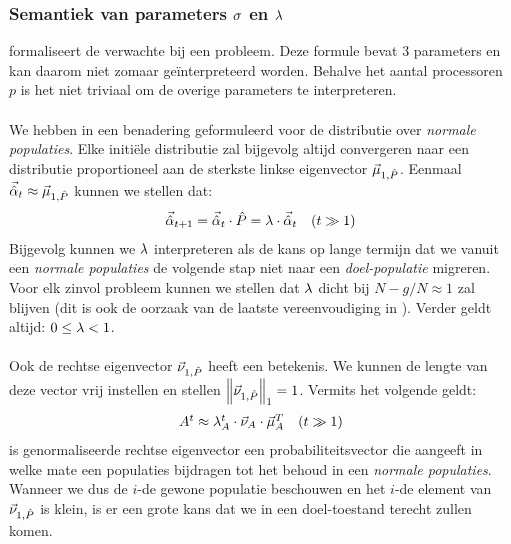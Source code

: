 \subsubsection{Semantiek van parameters $\metapa$ en $\metapb$}

 formaliseert de verwachte \absu{} bij een probleem. Deze formule bevat 3 parameters en kan daarom niet zomaar ge\"interpreteerd worden. Behalve het aantal processoren $p$ is het niet triviaal om de overige parameters te interpreteren.

\paragraph{}
We hebben in  een benadering geformuleerd voor de distributie over \emph{normale populaties}. Elke initi\"ele distributie zal bijgevolg altijd convergeren naar een distributie proportioneel aan de sterkste linkse eigenvector $\evl[1,\removmat]$. Eenmaal $\probdistnormmeta{t}\approx\evl[1,\removmat]$ kunnen we stellen dat:
\begin{equation}
\conditional{\probdistnormmeta{t+1}=\probdistnormmeta{t}\cdot\removmat=\metapb\cdot\probdistnormmeta{t}}{$t\gg 1$}
\end{equation}
Bijgevolg kunnen we $\metapb$ interpreteren als de kans op lange termijn dat we vanuit een \emph{normale populaties} de volgende stap niet naar een \emph{doel-populatie} migreren. Voor elk zinvol probleem kunnen we stellen dat $\metapb$ dicht bij $N-g/N\approx 1$ zal blijven (dit is ook de oorzaak van de laatste vereenvoudiging in ). Verder geldt altijd: $0\leq\metapb<1$.

\paragraph{}
Ook de rechtse eigenvector $\evr[1,\removmat]$ heeft een betekenis. We kunnen de lengte van deze vector vrij instellen en stellen $\dabs[1]{\evr[1,\removmat]}=1$. Vermits het volgende geldt:
\begin{equation}
\conditional{A^t\approx\ev[A]^t\cdot\evr[A]\cdot\evl[A]^T}{$t\gg1$}
\end{equation}
is genormaliseerde rechtse eigenvector een probabiliteitsvector die aangeeft in welke mate een populaties bijdragen tot het behoud in een \emph{normale populaties}. Wanneer we dus de $i$-de gewone populatie beschouwen en het $i$-de element van $\evr[1,\removmat]$ is klein, is er een grote kans dat we in een doel-toestand terecht zullen komen.

